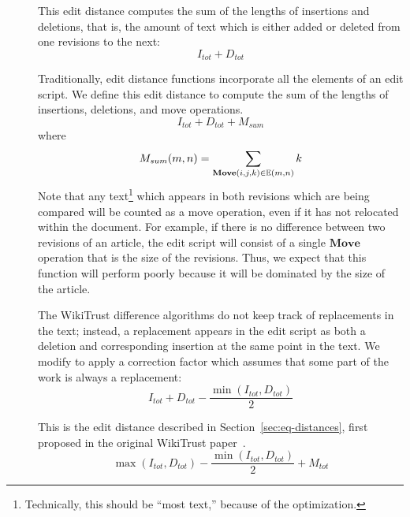 \begin{description}

\item[] This edit distance computes the sum of the lengths
    of insertions and deletions, that is, the amount of text which
    is either added or deleted from one revisions to the next:
    \begin{equation*}
    I_{tot} + D_{tot}
    \end{equation*}

\item[] Traditionally, edit distance functions incorporate
    all the elements of an edit script.  We define
    this edit distance to compute the sum of the lengths
    of insertions, deletions, and move operations.
    \begin{equation*}
    I_{tot} + D_{tot} + M_{sum}
    \end{equation*}
    where
    \begin{equation*}
    M_{sum}(m,n) = \sum_{\mathbf{Move}(i, j, k) \in \authorrevs{m, n}} k \\
    \end{equation*}
    Note that any text\footnote{Technically, this should be ``most
    text,'' because of the  optimization.}
    which appears in both revisions which are being
    compared will be counted as a move operation, even if it has not
    relocated within the document.
    For example, if there is no difference between two revisions of
    an article, the edit script will consist of a single $\mathbf{Move}$
    operation that is the size of the revisions.
    Thus, we expect that this function will perform poorly because
    it will be dominated by the size of the article.

\item[]
    The WikiTrust difference algorithms do not keep track of replacements
    in the text; instead, a replacement appears in the edit script as
    both a deletion and corresponding insertion at the same point in the text.
    We modify  to apply a correction factor which
    assumes that some part of the work is always a replacement:
    \begin{equation*}
    I_{tot} + D_{tot} - \frac{\min(I_{tot}, D_{tot})}{2}
    \end{equation*}

\item[] This is the edit distance described in
    Section~\ref{sec:eq-distances}, first proposed in
    the original WikiTrust paper~\cite{Adler2007}.
    \begin{equation*}
    \max(I_{tot}, D_{tot}) - \frac{\min(I_{tot}, D_{tot})}{2}
		+ M_{tot}
    \end{equation*}


\end{description}
